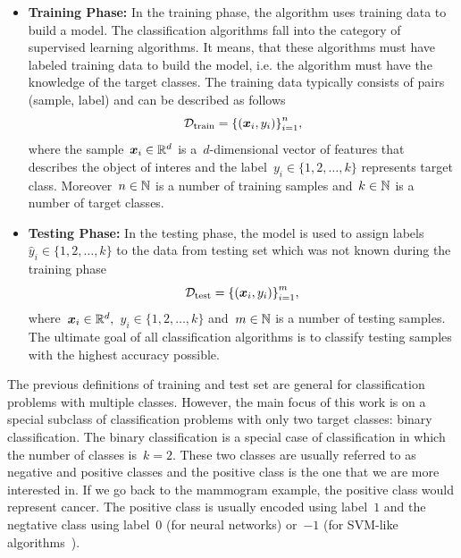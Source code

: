 \begin{itemize}
  \item \textbf{Training Phase:} In the training phase, the algorithm uses training data to build a model. The classification algorithms fall into the category of supervised learning algorithms. It means, that these algorithms must have labeled training data to build the model, i.e. the algorithm must have the knowledge of the target classes. The training data typically consists of pairs (sample, label) and can be described as follows
  \begin{equation*}\label{eq: training set}
    \D_{\mathrm{train}} = \Brac[c]{(\bm{x}_i, y_i)}_{i=1}^{n},
  \end{equation*}
  where the sample~$\bm{x}_i \in \mathbb{R}^d$ is a~$d$-dimensional vector of features that describes the object of interes and the label~$y_i \in \{1, 2, \ldots, k\}$ represents target class. Moreover~$n \in \mathbb{N}$ is a number of training samples and~$k \in \mathbb{N}$ is a number of target classes.
  \item \textbf{Testing Phase:} In the testing phase, the model is used to assign labels~$\hat{y}_i \in \{1, 2, \ldots, k\}$ to the data from testing set which was not known during the training phase
  \begin{equation*}\label{eq: test set}
    \D_{\mathrm{test}} = \Brac[c]{(\bm{x}_i, y_i)}_{i=1}^{m},
  \end{equation*}
  where~$\bm{x}_i \in \mathbb{R}^d,$~$y_i \in \{1, 2, \ldots, k\}$ and~$m \in \mathbb{N}$ is a number of testing samples. The ultimate goal of all classification algorithms is to classify testing samples with the highest accuracy possible.
\end{itemize}
The previous definitions of training and test set are general for classification problems with multiple classes. However, the main focus of this work is on a special subclass of classification problems with only two target classes: binary classification. The binary classification is a special case of classification in which the number of classes is~$k=2.$ These two classes are usually referred to as negative and positive classes and the positive class is the one that we are more interested in. If we go back to the mammogram example, the positive class would represent cancer. The positive class is usually encoded using label~$1$ and the negtative class using label~$0$ (for neural networks) or~$-1$ (for SVM-like algorithms~\cite{cortes1995support}).

